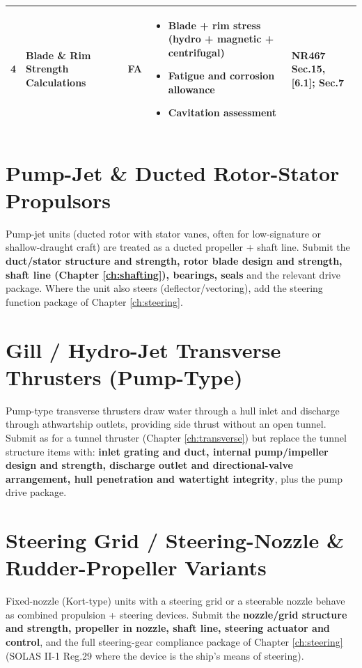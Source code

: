 \documentclass[11pt,a4paper]{report}
\newcommand{\fa}{\textbf{\textcolor{warningred}{FA}}}
\begin{document}
\begin{longtable}{|p{0.5cm}|p{5cm}|p{1.5cm}|p{5.5cm}|p{2cm}|}
4 & Blade \& Rim Strength Calculations & \fa{} &
\begin{itemize}[leftmargin=*,nosep]
\item Blade + rim stress (hydro + magnetic + centrifugal)
\item Fatigue and corrosion allowance
\item Cavitation assessment
\end{itemize} & NR467 Sec.15, [6.1]; Sec.7 \\
\hline

\end{longtable}

\section{Pump-Jet \& Ducted Rotor-Stator Propulsors}

Pump-jet units (ducted rotor with stator vanes, often for low-signature or
shallow-draught craft) are treated as a ducted propeller + shaft line. Submit the
\textbf{duct/stator structure and strength, rotor blade design and strength,
shaft line (Chapter \ref{ch:shafting}), bearings, seals} and the relevant drive
package. Where the unit also steers (deflector/vectoring), add the steering
function package of Chapter \ref{ch:steering}.

\section{Gill / Hydro-Jet Transverse Thrusters (Pump-Type)}

Pump-type transverse thrusters draw water through a hull inlet and discharge
through athwartship outlets, providing side thrust without an open tunnel. Submit
as for a tunnel thruster (Chapter \ref{ch:transverse}) but replace the tunnel
structure items with: \textbf{inlet grating and duct, internal pump/impeller
design and strength, discharge outlet and directional-valve arrangement, hull
penetration and watertight integrity}, plus the pump drive package.

\section{Steering Grid / Steering-Nozzle \& Rudder-Propeller Variants}

Fixed-nozzle (Kort-type) units with a steering grid or a steerable nozzle behave
as combined propulsion + steering devices. Submit the \textbf{nozzle/grid
structure and strength, propeller in nozzle, shaft line, steering actuator and
control}, and the full steering-gear compliance package of
Chapter \ref{ch:steering} (SOLAS II-1 Reg.29 where the device is the ship's
means of steering).
\end{document}
